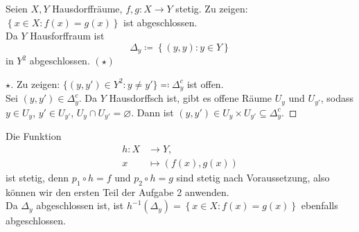 \begin{problem*}[3]
  Seien \( X, Y \) Hausdorffräume, \( f,g : X \to Y \) stetig. Zu zeigen: \( \left \{ x \in X : f(x) = g(x) \right \} \) ist abgeschlossen. \\
  Da \( Y \) Hausforffraum ist
  \begin{equation*}
    \Delta_y \coloneqq \left \{ (y,y): y \in Y \right \}
  \end{equation*}
  in \( Y^2 \) abgeschlossen. \( (\star) \)
  \begin{proof}[ \( \star \)]
    Zu zeigen: \( \{ (y, y') \in Y^2 : y \neq y' \} \eqqcolon \Delta_y^c \) ist offen. \\
    Sei \( (y,y') \in \Delta_y^c \). Da \( Y \) Hausdorffsch ist, gibt es offene Räume \( U_y \) und \( U_{y'} \), sodass \( y \in U_y \), \( y' \in U_{y'} \), \( U_y \cap U_{y'} = \varnothing \). Dann ist \( (y, y') \in U_y \times U_{y'} \subseteq \Delta_y^c \).
  \end{proof}
  Die Funktion
  \begin{align*}
    h : X &\to Y\text{,} \\
    x &\mapsto (f(x), g(x))
  \end{align*}
  ist stetig, denn \( p_1 \circ h = f \) und \( p_2 \circ h = g \) sind stetig nach Voraussetzung, also können wir den ersten Teil der Aufgabe 2 anwenden. \\
  Da \( \Delta_y \) abgeschlossen ist, ist \( h^{-1}(\Delta_y) = \left \{ x \in X : f(x) = g(x) \right \} \) ebenfalls abgeschlossen.
\end{problem*}

